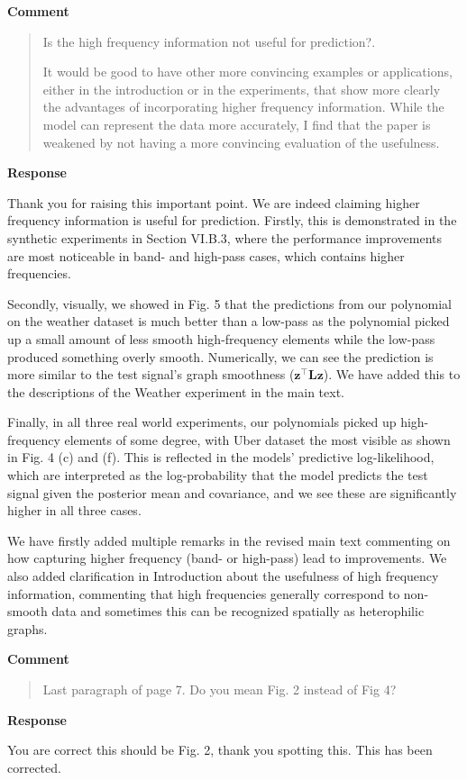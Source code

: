 \documentclass[11pt,onecolumn,journal]{IEEEtran}
\begin{document}
\textbf{Comment}

\begin{quote}
    Is the high frequency information not useful for prediction?.
    
    It would be good to have other more convincing examples or applications, either in the introduction or in the experiments, that show more clearly the advantages of incorporating higher frequency information. While the model can represent the data more accurately, I find that the paper is weakened by not having a more convincing evaluation of the usefulness.
\end{quote}

\textbf{Response}

Thank you for raising this important point. We are indeed claiming higher frequency information is useful for prediction. Firstly, this is demonstrated in the synthetic experiments in Section VI.B.3, where the performance improvements are most noticeable in band- and high-pass cases, which contains higher frequencies.

Secondly, visually, we showed in Fig. 5 that the predictions from our polynomial on the weather dataset is much better than a low-pass as the polynomial picked up a small amount of less smooth high-frequency elements while the low-pass produced something overly smooth. Numerically, we can see the prediction is more similar to the test signal's graph smoothness ($\mathbf{z}^\top \mathbf{L} \mathbf{z}$). We have added this to the descriptions of the Weather experiment in the main text.

Finally, in all three real world experiments, our polynomials picked up high-frequency elements of some degree, with Uber dataset the most visible as shown in Fig. 4 (c) and (f). This is reflected in the models' predictive log-likelihood, which are interpreted as the log-probability that the model predicts the test signal given the posterior mean and covariance, and we see these are significantly higher in all three cases.

We have firstly added multiple remarks in the revised main text commenting on how capturing higher frequency (band- or high-pass) lead to improvements. We also added clarification in Introduction about the usefulness of high frequency information, commenting that high frequencies generally correspond to non-smooth data and sometimes this can be recognized spatially as heterophilic graphs.

\textbf{Comment}

\begin{quote}
    Last paragraph of page 7. Do you mean Fig. 2 instead of Fig 4?
\end{quote}

\textbf{Response}

You are correct this should be Fig. 2, thank you spotting this. %
This has been corrected.
\end{document}

